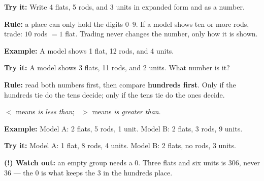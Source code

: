 \documentclass[12pt]{article}
\begin{document}
\begin{tryitbox}
\textbf{Try it:} \quad Write 4 flats, 5 rods, and 3 units in expanded form and as a number.\\[2pt]
\end{tryitbox}


\begin{formulabox}
\textbf{Rule:} a place can only hold the digits $0$--$9$. If a model shows ten or more
rods, trade: \quad $10$ rods $=1$ flat. \quad Trading never changes the number, only
how it is shown.
\end{formulabox}

\begin{examplebox}
\textbf{Example:} \quad A model shows 1 flat, 12 rods, and 4 units.
\end{examplebox}

\begin{tryitbox}
\textbf{Try it:} \quad A model shows 3 flats, 11 rods, and 2 units. What number is it?\\[2pt]
\end{tryitbox}


\begin{formulabox}
\textbf{Rule:} read both numbers first, then compare \textbf{hundreds first}. Only if
the hundreds tie do the tens decide; only if the tens tie do the ones decide.\par
$<$ means \emph{is less than}; \ $>$ means \emph{is greater than}.
\end{formulabox}

\begin{examplebox}
\textbf{Example:} \quad Model A: 2 flats, 5 rods, 1 unit. Model B: 2 flats, 3 rods, 9 units.
\end{examplebox}

\begin{tryitbox}
\textbf{Try it:} \quad Model A: 1 flat, 8 rods, 4 units. Model B: 2 flats, no rods, 3 units.\\[2pt]
\end{tryitbox}

\begin{watchoutbox}
\textbf{(!) Watch out:} an empty group needs a $0$. Three flats and six units is
$306$, never $36$ --- the $0$ is what keeps the $3$ in the hundreds place.
\end{watchoutbox}
\end{document}
